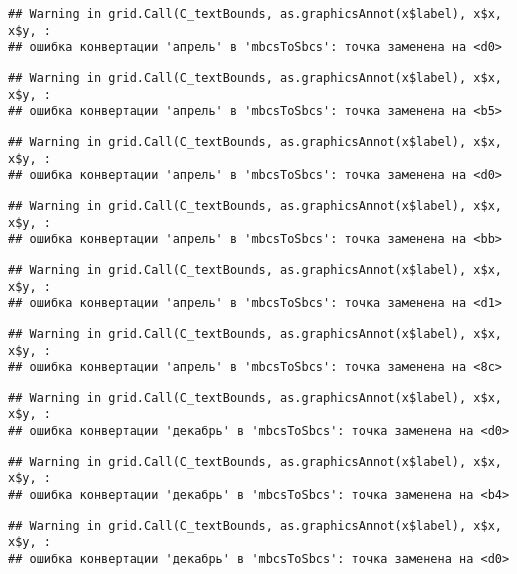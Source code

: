 \documentclass[
]{article}
\begin{document}
\begin{verbatim}
## Warning in grid.Call(C_textBounds, as.graphicsAnnot(x$label), x$x, x$y, :
## ошибка конвертации 'апрель' в 'mbcsToSbcs': точка заменена на <d0>
\end{verbatim}

\begin{verbatim}
## Warning in grid.Call(C_textBounds, as.graphicsAnnot(x$label), x$x, x$y, :
## ошибка конвертации 'апрель' в 'mbcsToSbcs': точка заменена на <b5>
\end{verbatim}

\begin{verbatim}
## Warning in grid.Call(C_textBounds, as.graphicsAnnot(x$label), x$x, x$y, :
## ошибка конвертации 'апрель' в 'mbcsToSbcs': точка заменена на <d0>
\end{verbatim}

\begin{verbatim}
## Warning in grid.Call(C_textBounds, as.graphicsAnnot(x$label), x$x, x$y, :
## ошибка конвертации 'апрель' в 'mbcsToSbcs': точка заменена на <bb>
\end{verbatim}

\begin{verbatim}
## Warning in grid.Call(C_textBounds, as.graphicsAnnot(x$label), x$x, x$y, :
## ошибка конвертации 'апрель' в 'mbcsToSbcs': точка заменена на <d1>
\end{verbatim}

\begin{verbatim}
## Warning in grid.Call(C_textBounds, as.graphicsAnnot(x$label), x$x, x$y, :
## ошибка конвертации 'апрель' в 'mbcsToSbcs': точка заменена на <8c>
\end{verbatim}

\begin{verbatim}
## Warning in grid.Call(C_textBounds, as.graphicsAnnot(x$label), x$x, x$y, :
## ошибка конвертации 'декабрь' в 'mbcsToSbcs': точка заменена на <d0>
\end{verbatim}

\begin{verbatim}
## Warning in grid.Call(C_textBounds, as.graphicsAnnot(x$label), x$x, x$y, :
## ошибка конвертации 'декабрь' в 'mbcsToSbcs': точка заменена на <b4>
\end{verbatim}

\begin{verbatim}
## Warning in grid.Call(C_textBounds, as.graphicsAnnot(x$label), x$x, x$y, :
## ошибка конвертации 'декабрь' в 'mbcsToSbcs': точка заменена на <d0>
\end{verbatim}
\end{document}
